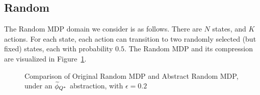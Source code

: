 \subsection{Random}

The Random MDP domain we consider is as follows. There are $N$ states, and $K$ actions. For each state, each action can transition to two randomly selected (but fixed) states, each with probability $0.5$. The Random MDP and its compression are visualized in Figure~\ref{fig:minefield-visual}.

\begin{figure}
\label{fig:minefield-visual}
\caption{Comparison of Original Random MDP and Abstract Random MDP, under an $\widetilde \phi_{Q^*}$ abstraction, with $\epsilon=0.2$}
\end{figure} 
